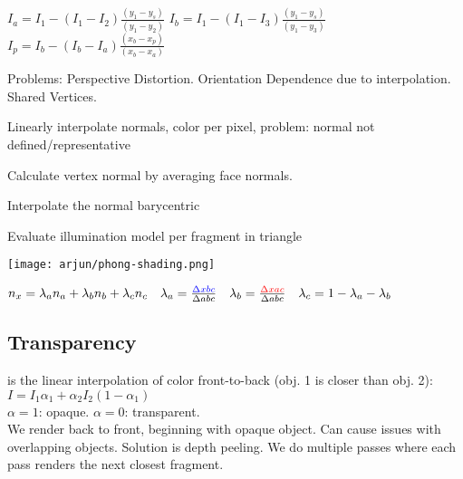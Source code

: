 $I_a = I_1 - (I_1 - I_2)\frac{(y_1-y_s)}{(y_1 - y_2)}$  
$I_b = I_1 - \left(I_1 - I_3\right) \frac{\left(y_1 - y_s\right)}{\left(y_1 - y_3\right)}$ 
$I_p = I_b - \left(I_b - I_a\right) \frac{\left(x_b - x_p\right)}{\left(x_b - x_a\right)}
$

Problems: Perspective Distortion. Orientation Dependence due to interpolation. Shared Vertices.

 Linearly interpolate normals, color per pixel, problem: normal not defined/representative
\begin{compactenum}
    \item Calculate vertex normal by averaging face normals.
    \item Interpolate the normal barycentric
    \item Evaluate illumination model per fragment in triangle
\end{compactenum}
\begin{center}
    \texttt{[image: arjun/phong-shading.png]}
\end{center}

$ n_x = \lambda_an_a + \lambda_bn_b + \lambda_cn_c  \quad \lambda_a = \frac{\color{blue} \Delta xbc}{\Delta abc} \quad \lambda_b = \frac{\color{red} \Delta xac}{\Delta abc} \quad \lambda_c = 1 - \lambda_a - \lambda_b$ 

\subsection*{Transparency}
 is the linear interpolation of color front-to-back (obj. 1 is closer than obj. 2): $I = I_1 \alpha_1 + \alpha_2 I_2 (1 - \alpha_1)$\\
$\alpha = 1 $: opaque. $\alpha = 0$: transparent.\\
We render back to front, beginning with opaque object. Can cause issues with overlapping objects. Solution is depth peeling. We do multiple passes where each pass renders the next closest fragment.